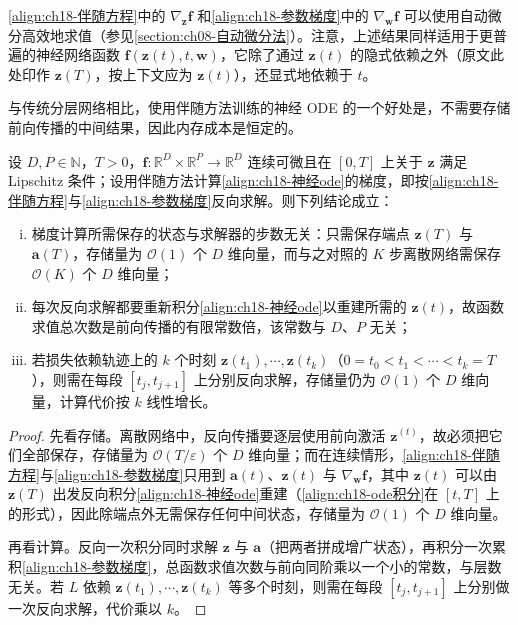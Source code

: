 \documentclass[../../main.tex]{subfiles}
\begin{document}
\eqref{align:ch18-伴随方程}中的 $\nabla_{\bm{z}}\bm{f}$ 和\eqref{align:ch18-参数梯度}中的 $\nabla_{\bm{w}}\bm{f}$ 可以使用自动微分高效地求值（参见\cref{section:ch08-自动微分法}）。注意，上述结果同样适用于更普遍的神经网络函数 $\bm{f}(\bm{z}(t),t,\bm{w})$，它除了通过 $\bm{z}(t)$ 的隐式依赖之外（原文此处印作 $\bm{z}(T)$，按上下文应为 $\bm{z}(t)$），还显式地依赖于 $t$。

与传统分层网络相比，使用伴随方法训练的神经 ODE 的一个好处是，不需要存储前向传播的中间结果，因此内存成本是恒定的。

\begin{proposition}[伴随方法的存储与计算代价]\label{proposition:ch18-伴随代价}
设 $D,P\in\mathbb{N}$，$T>0$，$\bm{f}:\mathbb{R}^{D}\times\mathbb{R}^{P}\to\mathbb{R}^{D}$ 连续可微且在 $[0,T]$ 上关于 $\bm{z}$ 满足 Lipschitz 条件；设用伴随方法计算\eqref{align:ch18-神经ode}的梯度，即按\eqref{align:ch18-伴随方程}与\eqref{align:ch18-参数梯度}反向求解。则下列结论成立：
\begin{enumerate}[(i)]
\item 梯度计算所需保存的状态与求解器的步数无关：只需保存端点 $\bm{z}(T)$ 与 $\bm{a}(T)$，存储量为 $\mathcal{O}(1)$ 个 $D$ 维向量，而与之对照的 $K$ 步离散网络需保存 $\mathcal{O}(K)$ 个 $D$ 维向量；
\item 每次反向求解都要重新积分\eqref{align:ch18-神经ode}以重建所需的 $\bm{z}(t)$，故函数求值总次数是前向传播的有限常数倍，该常数与 $D$、$P$ 无关；
\item 若损失依赖轨迹上的 $k$ 个时刻 $\bm{z}(t_{1}),\cdots,\bm{z}(t_{k})$（$0=t_{0}<t_{1}<\cdots<t_{k}=T$），则需在每段 $[t_{j},t_{j+1}]$ 上分别反向求解，存储量仍为 $\mathcal{O}(1)$ 个 $D$ 维向量，计算代价按 $k$ 线性增长。
\end{enumerate}
\end{proposition}

\begin{proof}
先看存储。离散网络中，反向传播要逐层使用前向激活 $\bm{z}^{(t)}$，故必须把它们全部保存，存储量为 $\mathcal{O}(T/\varepsilon)$ 个 $D$ 维向量；而在连续情形，\eqref{align:ch18-伴随方程}与\eqref{align:ch18-参数梯度}只用到 $\bm{a}(t)$、$\bm{z}(t)$ 与 $\nabla_{\bm{w}}\bm{f}$，其中 $\bm{z}(t)$ 可以由 $\bm{z}(T)$ 出发反向积分\eqref{align:ch18-神经ode}重建（\eqref{align:ch18-ode积分}在 $[t,T]$ 上的形式），因此除端点外无需保存任何中间状态，存储量为 $\mathcal{O}(1)$ 个 $D$ 维向量。

再看计算。反向一次积分同时求解 $\bm{z}$ 与 $\bm{a}$（把两者拼成增广状态），再积分一次累积\eqref{align:ch18-参数梯度}，总函数求值次数与前向同阶乘以一个小的常数，与层数无关。若 $L$ 依赖 $\bm{z}(t_1),\cdots,\bm{z}(t_k)$ 等多个时刻，则需在每段 $[t_j,t_{j+1}]$ 上分别做一次反向求解，代价乘以 $k$。
\end{proof}
\end{document}
